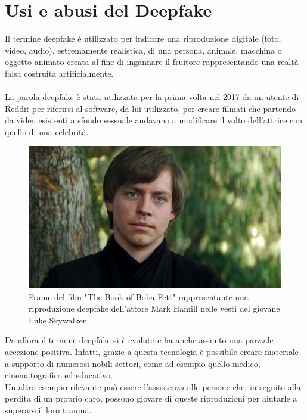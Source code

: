 \documentclass[12pt, a4paper]{article}
\begin{document}


\newpage
\section{Usi e abusi del Deepfake}
Il termine deepfake è utilizzato per indicare una riproduzione digitale (foto, video, audio), estremamente realistica, di una persona, animale, macchina o oggetto animato creata al fine di ingannare il fruitore rappresentando una realtà falsa costruita artificialmente.\\\\
La parola deepfake è stata utilizzata per la prima volta nel 2017 da un utente di Reddit per riferirsi al software, da lui utilizzato, per creare filmati che partendo da video esistenti a sfondo sessuale andavano a modificare il volto dell'attrice con quello di una celebrità\cite{OrigineDeepfake}. 
\\
\begin{figure}
\includegraphics[width=1\linewidth]{Luke}
\caption{Frame del film "The Book of Boba Fett" rappresentante una riproduzione deepfake dell'attore Mark Hamill nelle vesti del giovane Luke Skywalker}
\label{fig:wrapfig}
\end{figure}
Da allora il termine deepfake si è evoluto e ha anche assunto una parziale accezione positiva. Infatti, grazie a questa tecnologia è possibile creare materiale a supporto di numerosi nobili settori, come ad esempio quello medico, cinematografico ed educativo.\cite{LukeDeepfake}\\
Un altro esempio rilevante può essere l'assistenza alle persone che, in seguito alla perdita di un proprio caro, possono giovare di queste riproduzioni per aiutarle a superare il loro trauma\cite{SuperareTrauma}.
\end{document}
